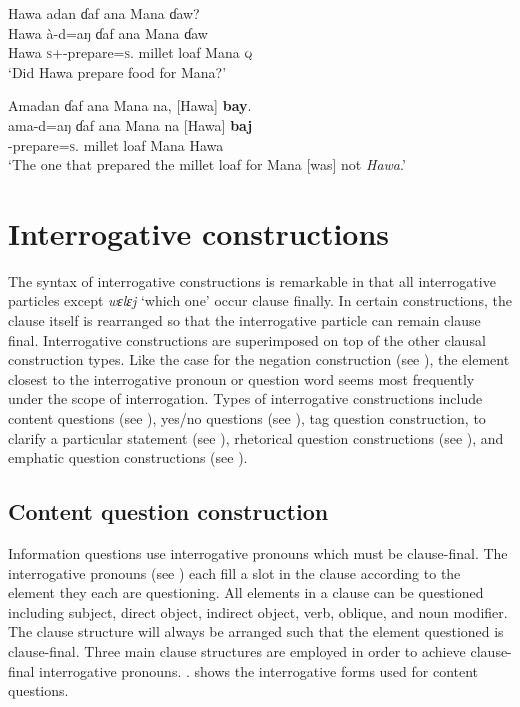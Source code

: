\ea \label{ex:10:51}
Hawa  adan  ɗaf  ana  Mana  ɗaw?\\
\gll  Hawa   à-d=aŋ    ɗaf  ana  Mana  ɗaw\\
      Hawa  \textsc{s}+{\PFV}-prepare=\textsc{s}.{\IO}  {millet loaf}  {\DAT} Mana  {\textsc{q}}\\
\glt  ‘Did Hawa prepare food for Mana?’
\z

\ea \label{ex:10:52}
Amadan  ɗaf  ana  Mana  na,  [Hawa]  \textbf{bay}.\\
\gll  ama-d=aŋ    ɗaf  ana  Mana  na  [Hawa]   \textbf{baj}\\
      {\DEP}-prepare=\textsc{s}.{\IO}  {millet loaf}  {\DAT} Mana  {\PSP}  Hawa   {\NEG}\\
\glt  ‘The one that prepared the millet loaf for Mana [was] not \textit{Hawa}.’
\z

\section{Interrogative constructions}\label{sec:10.3}
\hypertarget{RefHeading1212981525720847}{}
The syntax of interrogative constructions is remarkable in that all interrogative particles except \textit{wɛlɛj} ‘which one' occur clause finally. In certain constructions, the clause itself is rearranged so that the interrogative particle can remain clause final. Interrogative constructions are superimposed on top of the other clausal construction types. Like the case for the negation construction (see ), the element closest to the interrogative pronoun or question word seems most frequently under the scope of interrogation. Types of interrogative constructions include content questions (see ), yes/no questions (see ), tag question construction, to clarify a particular statement (see ), rhetorical question constructions (see ), and emphatic question constructions (see ).  

\subsection{Content question construction}\label{sec:10.3.1}
\hypertarget{RefHeading1213001525720847}{}
Information questions use interrogative pronouns which must be clause-final. The interrogative pronouns (see ) each fill a slot in the clause according to the element they each are questioning. All elements in a clause can be questioned including subject, direct object, indirect object, verb, oblique, and noun modifier. The clause structure will always be arranged such that the element questioned is clause-final. Three main clause structures are employed in order to achieve clause-final interrogative pronouns. . shows the interrogative forms used for content questions. 

